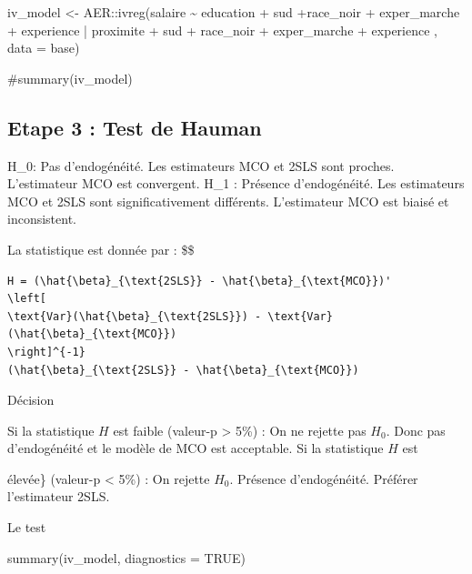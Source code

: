 \documentclass[
  letterpaper,
  DIV=11,
  numbers=noendperiod]{scrartcl}
\newenvironment{Shaded}{\begin{snugshade}}{\end{snugshade}}
\newcommand{\AttributeTok}[1]{\textcolor[rgb]{0.40,0.45,0.13}{#1}}
\newcommand{\CommentTok}[1]{\textcolor[rgb]{0.37,0.37,0.37}{#1}}
\newcommand{\ConstantTok}[1]{\textcolor[rgb]{0.56,0.35,0.01}{#1}}
\newcommand{\FunctionTok}[1]{\textcolor[rgb]{0.28,0.35,0.67}{#1}}
\newcommand{\NormalTok}[1]{\textcolor[rgb]{0.00,0.23,0.31}{#1}}
\newcommand{\OtherTok}[1]{\textcolor[rgb]{0.00,0.23,0.31}{#1}}
\newcommand{\SpecialCharTok}[1]{\textcolor[rgb]{0.37,0.37,0.37}{#1}}
\begin{document}
\begin{Shaded}
\begin{Highlighting}[]
\NormalTok{iv\_model }\OtherTok{\textless{}{-}}\NormalTok{ AER}\SpecialCharTok{::}\FunctionTok{ivreg}\NormalTok{(salaire }\SpecialCharTok{\textasciitilde{}}\NormalTok{ education }\SpecialCharTok{+}\NormalTok{ sud }\SpecialCharTok{+}\NormalTok{race\_noir }\SpecialCharTok{+}\NormalTok{ exper\_marche }\SpecialCharTok{+}\NormalTok{ experience }\SpecialCharTok{|}
\NormalTok{                            proximite }\SpecialCharTok{+}\NormalTok{ sud }\SpecialCharTok{+}\NormalTok{ race\_noir }\SpecialCharTok{+}\NormalTok{ exper\_marche }\SpecialCharTok{+}\NormalTok{ experience ,}
                  \AttributeTok{data =}\NormalTok{ base)}


\CommentTok{\#summary(iv\_model)}
\end{Highlighting}
\end{Shaded}

\subsection{Etape 3 : Test de Hauman}\label{etape-3-test-de-hauman}

H\_0: Pas d'endogénéité. Les estimateurs MCO et 2SLS sont proches.
L'estimateur MCO est convergent. H\_1 : Présence d'endogénéité. Les
estimateurs MCO et 2SLS sont significativement différents. L'estimateur
MCO est biaisé et inconsistent.

La statistique est donnée par : \$\$

\begin{verbatim}
H = (\hat{\beta}_{\text{2SLS}} - \hat{\beta}_{\text{MCO}})' 
\left[
\text{Var}(\hat{\beta}_{\text{2SLS}}) - \text{Var}(\hat{\beta}_{\text{MCO}})
\right]^{-1}
(\hat{\beta}_{\text{2SLS}} - \hat{\beta}_{\text{MCO}})
\end{verbatim}

Décision

Si la statistique \(H\) est faible (valeur-p \textgreater{} 5\%) : On ne
rejette pas \(H_0\). Donc pas d'endogénéité et le modèle de MCO est
acceptable. Si la statistique \(H\) est

élevée\} (valeur-p \textless{} 5\%) : On rejette \(H_0\). Présence
d'endogénéité. Préférer l'estimateur 2SLS.

Le test

\begin{Shaded}
\begin{Highlighting}[]
\FunctionTok{summary}\NormalTok{(iv\_model, }\AttributeTok{diagnostics =} \ConstantTok{TRUE}\NormalTok{)}
\end{Highlighting}
\end{Shaded}
\end{document}
